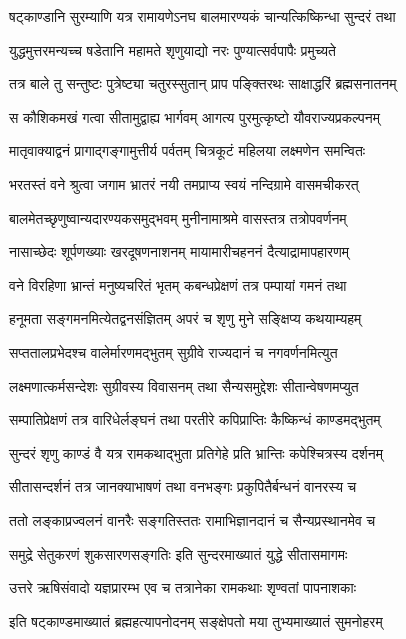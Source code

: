 \twolineshloka
{षट्काण्डानि सुरम्याणि यत्र रामायणेऽनघ}
{बालमारण्यकं चान्यत्किष्किन्धा सुन्दरं तथा}%

\twolineshloka
{युद्धमुत्तरमन्यच्च षडेतानि महामते}
{शृणुयाद्यो नरः पुण्यात्सर्वपापैः प्रमुच्यते}%

\twolineshloka
{तत्र बाले तु सन्तुष्टः पुत्रेष्ट्या चतुरस्सुतान्}
{प्राप पङ्क्तिरथः साक्षाद्धरिं ब्रह्मसनातनम्}%

\twolineshloka
{स कौशिकमखं गत्वा सीतामुद्वाह्य भार्गवम्}
{आगत्य पुरमुत्कृष्टो यौवराज्यप्रकल्पनम्}%

\twolineshloka
{मातृवाक्याद्वनं प्रागाद्गङ्गामुत्तीर्य पर्वतम्}
{चित्रकूटं महिलया लक्ष्मणेन समन्वितः}%

\twolineshloka
{भरतस्तं वने श्रुत्वा जगाम भ्रातरं नयी}
{तमप्राप्य स्वयं नन्दिग्रामे वासमचीकरत्}%

\twolineshloka
{बालमेतच्छृणुष्वान्यदारण्यकसमुद्भवम्}
{मुनीनामाश्रमे वासस्तत्र तत्रोपवर्णनम्}%

\twolineshloka
{नासाच्छेदः शूर्पणख्याः खरदूषणनाशनम्}
{मायामारीचहननं दैत्याद्रामापहारणम्}%

\twolineshloka
{वने विरहिणा भ्रान्तं मनुष्यचरितं भृतम्}
{कबन्धप्रेक्षणं तत्र पम्पायां गमनं तथा}%

\twolineshloka
{हनूमता सङ्गमनमित्येतद्वनसंज्ञितम्}
{अपरं च शृणु मुने सङ्क्षिप्य कथयाम्यहम्}%

\twolineshloka
{सप्ततालप्रभेदश्च वालेर्मारणमद्भुतम्}
{सुग्रीवे राज्यदानं च नगवर्णनमित्युत}%

\twolineshloka
{लक्ष्मणात्कर्मसन्देशः सुग्रीवस्य विवासनम्}
{तथा सैन्यसमुद्देशः सीतान्वेषणमप्युत}%

\twolineshloka
{सम्पातिप्रेक्षणं तत्र वारिधेर्लङ्घनं तथा}
{परतीरे कपिप्राप्तिः कैष्किन्धं काण्डमद्भुतम्}%

\twolineshloka
{सुन्दरं शृणु काण्डं वै यत्र रामकथाद्भुता}
{प्रतिगेहे प्रति भ्रान्तिः कपेश्चित्रस्य दर्शनम्}%

\twolineshloka
{सीतासन्दर्शनं तत्र जानक्याभाषणं तथा}
{वनभङ्गः प्रकुपितैर्बन्धनं वानरस्य च}%

\twolineshloka
{ततो लङ्काप्रज्वलनं वानरैः सङ्गतिस्ततः}
{रामाभिज्ञानदानं च सैन्यप्रस्थानमेव च}%

\twolineshloka
{समुद्रे सेतुकरणं शुकसारणसङ्गतिः}
{इति सुन्दरमाख्यातं युद्धे सीतासमागमः}%

\twolineshloka
{उत्तरे ऋषिसंवादो यज्ञप्रारम्भ एव च}
{तत्रानेका रामकथाः शृण्वतां पापनाशकाः}%

\twolineshloka
{इति षट्काण्डमाख्यातं ब्रह्महत्यापनोदनम्}
{सङ्क्षेपतो मया तुभ्यमाख्यातं सुमनोहरम्}%

